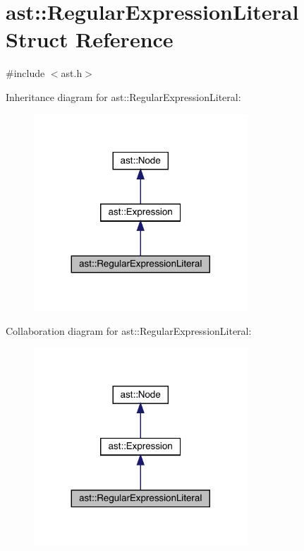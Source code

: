 \hypertarget{structast_1_1_regular_expression_literal}{}\section{ast\+:\+:Regular\+Expression\+Literal Struct Reference}
\label{structast_1_1_regular_expression_literal}


{\ttfamily \#include $<$ast.\+h$>$}



Inheritance diagram for ast\+:\+:Regular\+Expression\+Literal\+:
\nopagebreak
\begin{figure}[H]
\begin{center}
\leavevmode
\includegraphics[width=227pt]{structast_1_1_regular_expression_literal__inherit__graph}
\end{center}
\end{figure}


Collaboration diagram for ast\+:\+:Regular\+Expression\+Literal\+:
\nopagebreak
\begin{figure}[H]
\begin{center}
\leavevmode
\includegraphics[width=227pt]{structast_1_1_regular_expression_literal__coll__graph}
\end{center}
\end{figure}

